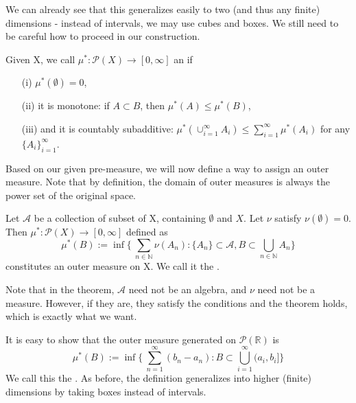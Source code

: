 \documentclass[11pt]{scrartcl}
\begin{document}
\begin{remark}
We can already see that this generalizes easily to two (and thus any finite) dimensions - instead of intervals, we may use cubes and boxes. We still need to be careful how to proceed in our construction.
\end{remark}

\begin{definition}
Given X, we call $\mu^*: \mathcal{P}(X) \rightarrow [0,\infty]$ an  if 
\begin{itemize}
\item[(i)] $\mu^*(\emptyset) = 0$,
\item[(ii)] it is monotone: if $ A \subset B$, then $\mu^*(A)\leq \mu^*(B)$,
\item[(iii)] and it is countably subadditive: $\mu^*(\cup_{i=1}^\infty A_i) \leq \sum_{i=1}^\infty \mu^*(A_i)$ for any $\{A_i\}_{i=1}^\infty$.
\end{itemize}
\end{definition}

Based on our given pre-measure, we will now define a way to assign an outer measure. Note that by definition, the domain of outer measures is always the power set of the original space.

\begin{theorem}
Let $\mathcal{A}$ be a collection of subset of X, containing $\emptyset$ and $X$. Let $\nu$ satisfy $\nu(\emptyset) = 0 $. Then $\mu^*: \mathcal{P}(X) \rightarrow [0,\infty]$ defined as 
$$\mu^*(B) := 
\inf \{\ \sum_{n \in \mathbb{N}} \nu(A_n) :  \{A_n\} \subset \mathcal{A}, B \subset \bigcup_{n\in \mathbb{N}} A_n  \}$$
constitutes an outer measure on X. We call it the .
\end{theorem}

\begin{remark}
Note that in the theorem, $\mathcal{A}$ need not be an algebra, and $\nu$ need not be a measure. However, if they are, they satisfy the conditions and the theorem holds, which is exactly what we want.
\end{remark}


\begin{example}
It is easy to show that the outer measure generated on $\mathcal{P}(\mathbb{R})$ is 
$$\mu^*(B) := 
\inf \{\ \sum_{n=1}^\infty (b_n - a_n) :  B \subset  \bigcup_{i=1}^\infty (a_i,b_i]  \}$$
We call this the . As before, the definition generalizes into higher (finite) dimensions by taking boxes instead of intervals.
\end{example}
\end{document}

